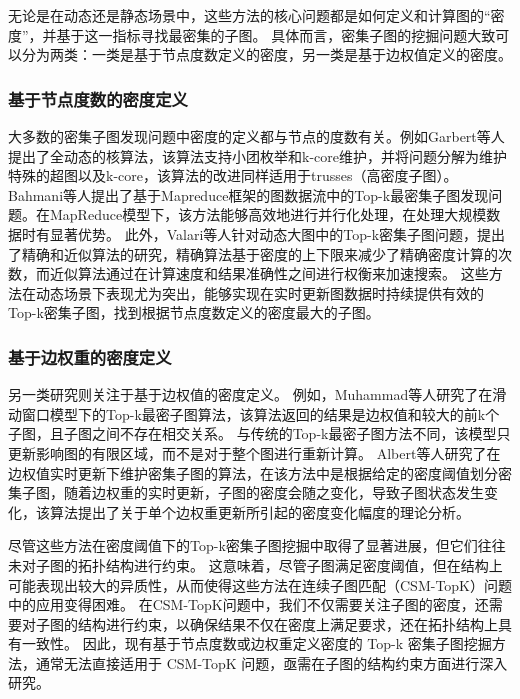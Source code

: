 无论是在动态还是静态场景中，这些方法的核心问题都是如何定义和计算图的“密度”，并基于这一指标寻找最密集的子图。
具体而言，密集子图的挖掘问题大致可以分为两类：一类是基于节点度数定义的密度，另一类是基于边权值定义的密度。

\subsubsection{基于节点度数的密度定义}
大多数的密集子图发现问题中密度的定义都与节点的度数有关。例如Garbert等人\cite{dsm-noweight-Gabert-DBLP:conf/wsdm/GabertPC21}提出了全动态的核算法，该算法支持小团枚举和k-core维护，并将问题分解为维护特殊的超图以及k-core，该算法的改进同样适用于trusses（高密度子图）。
Bahmani等人\cite{dsm-noweight-Bahmani-DBLP:journals/pvldb/BahmaniKV12}提出了基于Mapreduce框架的图数据流中的Top-k最密集子图发现问题。在MapReduce模型\cite{csm-mapreduce-DBLP:journals/cacm/DeanG08}下，该方法能够高效地进行并行化处理，在处理大规模数据时有显著优势。
此外，Valari等人\cite{dsm-noweight-Valari-DBLP:conf/ssdbm/ValariKP12}针对动态大图中的Top-k密集子图问题，提出了精确和近似算法的研究，精确算法基于密度的上下限来减少了精确密度计算的次数，而近似算法通过在计算速度和结果准确性之间进行权衡来加速搜索。
这些方法在动态场景下表现尤为突出，能够实现在实时更新图数据时持续提供有效的Top-k密集子图，找到根据节点度数定义的密度最大的子图。

\subsubsection{基于边权重的密度定义}
另一类研究则关注于基于边权值的密度定义。
例如，Muhammad\cite{dsm-weight-Muhammad-DBLP:conf/cikm/NasirGMG17}等人研究了在滑动窗口模型下的Top-k最密子图算法，该算法返回的结果是边权值和较大的前k个子图，且子图之间不存在相交关系。
与传统的Top-k最密子图方法不同，该模型只更新影响图的有限区域，而不是对于整个图进行重新计算。
Albert等人\cite{dsm-weight-Angel-DBLP:journals/vldb/AngelKSSST14}研究了在边权值实时更新下维护密集子图的算法，在该方法中是根据给定的密度阈值划分密集子图，随着边权重的实时更新，子图的密度会随之变化，导致子图状态发生变化，该算法提出了关于单个边权重更新所引起的密度变化幅度的理论分析。

尽管这些方法在密度阈值下的Top-k密集子图挖掘中取得了显著进展，但它们往往未对子图的拓扑结构进行约束。
这意味着，尽管子图满足密度阈值，但在结构上可能表现出较大的异质性，从而使得这些方法在连续子图匹配（CSM-TopK）问题中的应用变得困难。
在CSM-TopK问题中，我们不仅需要关注子图的密度，还需要对子图的结构进行约束，以确保结果不仅在密度上满足要求，还在拓扑结构上具有一致性。
因此，现有基于节点度数或边权重定义密度的 Top-k 密集子图挖掘方法，通常无法直接适用于 CSM-TopK 问题，亟需在子图的结构约束方面进行深入研究。

